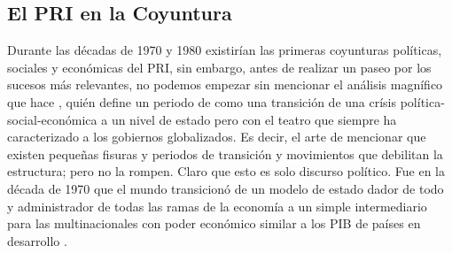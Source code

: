 \subsection{El PRI en la Coyuntura}
\label{ssec:PRI-Coyuntura}

Durante las décadas de 1970 y 1980 existirían las primeras coyunturas políticas, sociales y económicas del PRI, sin embargo, antes de realizar un paseo por los sucesos más 
relevantes, no podemos empezar sin mencionar el análisis magnífico que hace \cite{bauman_estado}, quién define un periodo de  como una transición 
de una crísis política-social-económica a un nivel de estado pero con el teatro que siempre ha caracterizado a los gobiernos globalizados. Es decir, el arte de 
mencionar que existen pequeñas fisuras y periodos de transición y movimientos que debilitan la estructura; pero no la rompen. Claro que esto es solo discurso político.
Fue en la década de 1970 que el mundo transicionó de un modelo de estado dador de todo y administrador de todas las ramas de la economía a un simple intermediario para las 
multinacionales con poder económico similar a los PIB de países en desarrollo \cite{bauman_globalizacion_1999}.

